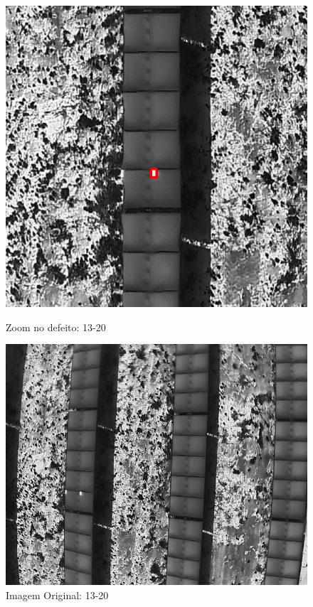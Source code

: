 \documentclass[dvipsnames]{article}%
\begin{document}
\begin{figure}[h!]
\begin{minipage}{0.31\linewidth}
\includegraphics[width=\linewidth]{report_images/hotspots_13-20_cropped.jpg}%
\caption{Zoom no defeito: 13-20}%
\end{minipage}%
\hfill%
\begin{minipage}{0.31\linewidth}%
\centering%
\centering%
\includegraphics[width=\linewidth]{report_images/hotspots_13-20.jpg}%
\caption{Imagem Original: 13-20}%
\end{minipage}%
\end{figure}
\end{document}
